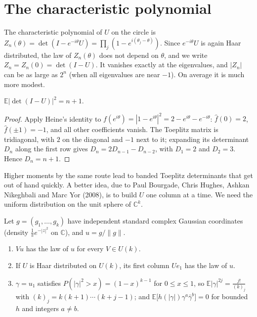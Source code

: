 \section{The characteristic polynomial}

The characteristic polynomial of $U$ on the circle is $Z_n(\theta)=\det(I-e^{-i\theta}U)=\prod_j(1-e^{i(\theta_j-\theta)})$. Since $e^{-i\theta}U$ is again Haar distributed, the law of $Z_n(\theta)$ does not depend on $\theta$, and we write
$Z_n=Z_n(0)=\det(I-U)$. It vanishes exactly at the eigenvalues, and $|Z_n|$ can be as large as $2^n$ (when all eigenvalues are near $-1$). On average it is much more modest.

\begin{proposition}\label{prop:secondmoment}
$\mathbb E|\det(I-U)|^2=n+1$.
\end{proposition}

\begin{proof}
Apply Heine's identity to $f(e^{i\theta})=|1-e^{i\theta}|^2=2-e^{i\theta}-e^{-i\theta}$: $\hat f(0)=2$, $\hat f(\pm1)=-1$, and all other coefficients vanish. The Toeplitz matrix is tridiagonal, with $2$ on the diagonal and $-1$ next to it; expanding
its determinant $D_n$ along the first row gives $D_n=2D_{n-1}-D_{n-2}$, with $D_1=2$ and $D_2=3$. Hence $D_n=n+1$.
\end{proof}

Higher moments by the same route lead to banded Toeplitz determinants that get out of hand quickly. A better idea, due to Paul Bourgade, Chris Hughes, Ashkan Nikeghbali and Marc Yor (2008), is to build $U$ one column at a time.
We need the uniform distribution on the unit sphere of $\mathbb C^k$.

\begin{lemma}\label{lem:uniformvector}
Let $g=(g_1,\dots,g_k)$ have independent standard complex Gaussian coordinates (density $\frac1\pi e^{-|z|^2}$ on $\mathbb C$), and $u=g/\|g\|$.
\begin{enumerate}
\item $Vu$ has the law of $u$ for every $V\in U(k)$.
\item If $U$ is Haar distributed on $U(k)$, its first column $Ue_1$ has the law of $u$.
\item $\gamma=u_1$ satisfies $P(|\gamma|^2>x)=(1-x)^{k-1}$ for $0\le x\le1$, so $\mathbb E|\gamma|^{2j}=\frac{j!}{(k)_j}$ with $(k)_j=k(k+1)\cdots(k+j-1)$; and $\mathbb E\bigl[h(|\gamma|)\gamma^a\bar\gamma^b\bigr]=0$ for bounded $h$ and integers $a\ne b$.
\end{enumerate}
\end{lemma}

